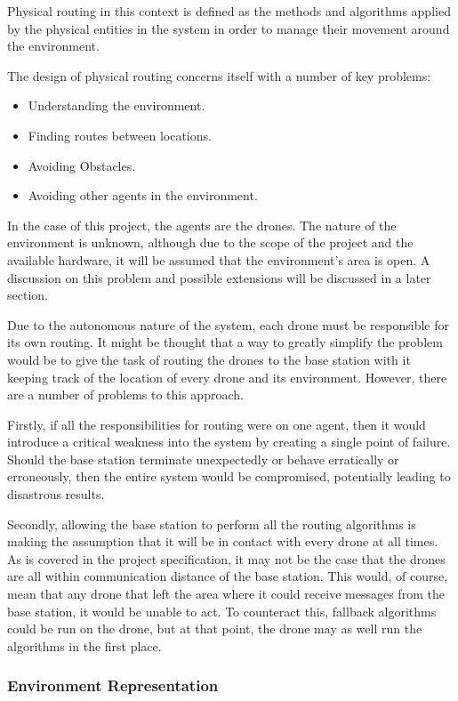 Physical routing in this context is defined as the methods and algorithms applied by the physical entities in the system in order to manage their movement around the environment.

The design of physical routing concerns itself with a number of key problems:
\begin{itemize}
\item Understanding the environment.
\item Finding routes between locations.
\item Avoiding Obstacles.
\item Avoiding other agents in the environment.
\end{itemize}

In the case of this project, the agents are the drones. The nature of the environment is unknown, although due to the scope of the project and the available hardware, it will be assumed that the environment's area is open. A discussion on this problem and possible extensions will be discussed in a later section.

Due to the autonomous nature of the system, each drone must be responsible for its own routing. It might be thought that a way to greatly simplify the problem would be to give the task of routing the drones to the base station with it keeping track of the location of every drone and its environment. However, there are a number of problems to this approach.

Firstly, if all the responsibilities for routing were on one agent, then it would introduce a critical weakness into the system by creating a single point of failure. Should the base station terminate unexpectedly or behave erratically or erroneously, then the entire system would be compromised, potentially leading to disastrous results.

Secondly, allowing the base station to perform all the routing algorithms is making the assumption that it will be in contact with every drone at all times. As is covered in the project specification, it may not be the case that the drones are all within communication distance of the base station. This would, of course, mean that any drone that left the area where it could receive messages from the base station, it would be unable to act. To counteract this, fallback algorithms could be run on the drone, but at that point, the drone may as well run the algorithms in the first place.

\subsubsection{Environment Representation}
		
